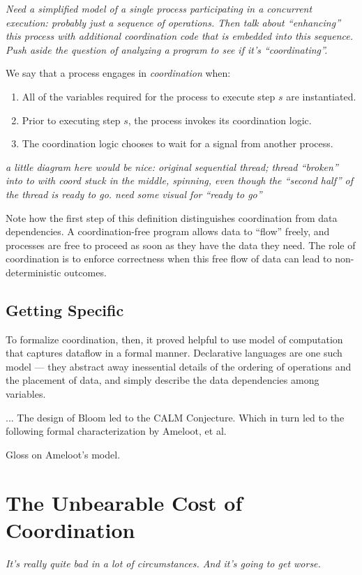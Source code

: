 \documentclass{sig-alternate}
\begin{document}
\emph{Need a simplified model of a single process participating in a concurrent execution: probably just a sequence of operations.  Then talk about ``enhancing'' this process with additional coordination code that is embedded into this sequence.  Push aside the question of analyzing a program to see if it's ``coordinating''.}

We say that a process engages in \emph{coordination} when:
\begin{enumerate}
\item All of the variables required for the process to execute step $s$ are instantiated.
\item Prior to executing step $s$, the process invokes its coordination logic.
\item The coordination logic chooses to wait for a signal from another process.
\end{enumerate}

\emph{a little diagram here would be nice: original sequential thread; thread ``broken'' into to with coord stuck in the middle, spinning, even though the ``second half'' of the thread is ready to go.  need some visual for ``ready to go''}

Note how the first step of this definition distinguishes coordination from data dependencies.  A coordination-free program allows data to ``flow'' freely, and processes are free to proceed as soon as they have the data they need.  The role of coordination is to enforce correctness when this free flow of data can lead to non-deterministic outcomes.

\subsection{Getting Specific}
To formalize coordination, then, it proved helpful to use model of computation that captures dataflow in a formal manner.  Declarative languages are one such model --- they abstract away inessential details of the ordering of operations and the placement of data, and simply describe the data dependencies among variables.  

... The design of Bloom led to the CALM Conjecture.  Which in turn led to the following formal characterization by Ameloot, et al.  

Gloss on Ameloot's model.

\section{The Unbearable Cost of Coordination}
\label{sec:costs}
\emph{It's really quite bad in a lot of circumstances.  And it's going to get worse.}
\end{document}
